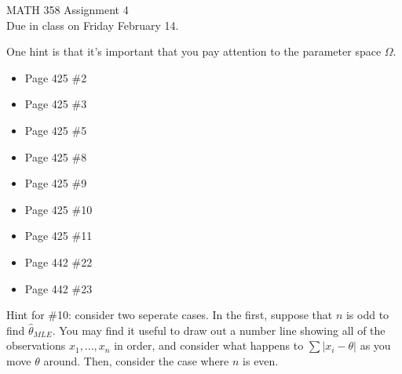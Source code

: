 \documentclass[11pt]{article}
\begin{document}
\large
\begin{center}
MATH 358 Assignment 4\\
\normalsize
Due in class on Friday February 14.\\
\end{center}
One hint is that it's important that you pay attention to the parameter space $\Omega$.\\
\begin{itemize}
\item Page 425 \#2
\item Page 425 \#3
\item Page 425 \#5
\item Page 425 \#8
\item Page 425 \#9
\item Page 425 \#10
\item Page 425 \#11
\item Page 442 \#22
\item Page 442 \#23
\end{itemize}

Hint for \#10: consider two seperate cases.  In the first, suppose that $n$ is odd to find $\hat{\theta}_{MLE}$.  You may find it useful to draw out a number line showing all of the observations $x_1, ..., x_n$ in order, and consider what happens to $\sum |x_i - \theta|$ as you move $\theta$ around.  Then, consider the case where $n$ is even.
\end{document}
